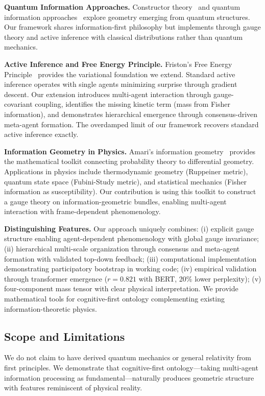 \documentclass[11pt]{article}
\begin{document}
\textbf{Quantum Information Approaches.} Constructor theory~\cite{Deutsch2015} and quantum information approaches~\cite{Cao2017} explore geometry emerging from quantum structures. Our framework shares information-first philosophy but implements through gauge theory and active inference with classical distributions rather than quantum mechanics.

\textbf{Active Inference and Free Energy Principle.} Friston's Free Energy Principle~\cite{Friston2010,Parr2022} provides the variational foundation we extend. Standard active inference operates with single agents minimizing surprise through gradient descent. Our extension introduces multi-agent interaction through gauge-covariant coupling, identifies the missing kinetic term (mass from Fisher information), and demonstrates hierarchical emergence through consensus-driven meta-agent formation. The overdamped limit of our framework recovers standard active inference exactly.

\textbf{Information Geometry in Physics.} Amari's information geometry~\cite{Amari2016} provides the mathematical toolkit connecting probability theory to differential geometry. Applications in physics include thermodynamic geometry (Ruppeiner metric), quantum state space (Fubini-Study metric), and statistical mechanics (Fisher information as susceptibility). Our contribution is using this toolkit to construct a gauge theory on information-geometric bundles, enabling multi-agent interaction with frame-dependent phenomenology.

\textbf{Distinguishing Features.} Our approach uniquely combines: (i) explicit gauge structure enabling agent-dependent phenomenology with global gauge invariance; (ii) hierarchical multi-scale organization through consensus and meta-agent formation with validated top-down feedback; (iii) computational implementation demonstrating participatory bootstrap in working code; (iv) empirical validation through transformer emergence ($r = 0.821$ with BERT, 20\% lower perplexity); (v) four-component mass tensor with clear physical interpretation. We provide mathematical tools for cognitive-first ontology complementing existing information-theoretic physics.

\subsection{Scope and Limitations}

We do not claim to have derived quantum mechanics or general relativity from first principles. We demonstrate that cognitive-first ontology---taking multi-agent information processing as fundamental---naturally produces geometric structure with features reminiscent of physical reality.
\end{document}
